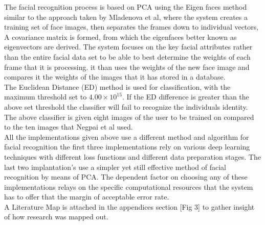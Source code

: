 \documentclass[journal]{IEEEtran}
\begin{document}
The facial recognition process is based on PCA using the Eigen faces method similar to the approach taken by Mladenova et al, where the system creates a training set of face images, then separates the frames down to individual vectors, A covariance matrix is formed, from which the eigenfaces better known as eigenvectors are derived. The system focuses on the key facial attributes rather than the entire facial data set to be able to best determine the weights of each frame that it is processing. it than uses the weights of the new face image and compares it the weights of the images that it has stored in a database.\\

The Euclidean Distance (ED) method is used for classification, with the maximum threshold set to $4.00 \times 10^{15}$. If the ED difference is greater than the above set threshold the classifier will fail to recognize the individuals identity. The above classifier is given eight images of the user to be trained on compared to the ten images that Negpai et al used.\\

All the implementations given above use a different method and algorithm for facial recognition the first three implementations rely on various deep learning techniques with different loss functions and different data preparation stages. The last two implantation's use a simpler yet still effective method of facial recognition by means of PCA. The dependent factor on choosing any of these implementations relays on the specific computational resources that the system has to offer that the margin of acceptable error rate.\\

A Literature Map is attached in the appendices section [Fig 3] to gather insight of how research was mapped out.
\end{document}
